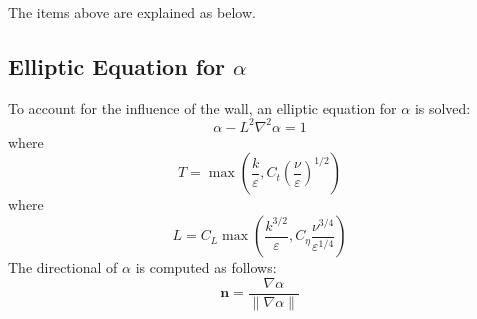 \documentclass[11pt]{article}
\begin{document}
The items above are explained as below.
\subsection{Elliptic Equation for $\alpha$}
To account for the influence of the wall, an elliptic equation for $\alpha$ is solved:
\begin{equation}
\alpha - L^{2} \nabla^{2} \alpha = 1
\end{equation}
where
\begin{equation}
T = \max \left( \frac{k}{\varepsilon}, C_{t} \left( \frac{\nu}{\varepsilon}\right) ^{1/2} \right)
\end{equation}
where
\begin{equation}
L = C_{L} \max \left(  \frac{k^{3/2}}{\varepsilon}, C_{\eta} \frac{\nu^{3/4}}{\varepsilon^{1/4}} \right)
\end{equation}
The directional of $\alpha$ is computed as follows:
\begin{equation}
\mathbf{n} = \frac{\nabla \alpha}{\| \nabla \alpha \|}
\label{n}
\end{equation}
\end{document}
